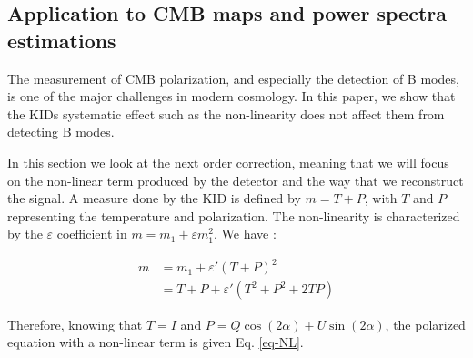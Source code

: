
%


\subsection{Application to CMB maps and power spectra estimations}
The measurement of CMB polarization, and especially the detection of B modes, is one of the major challenges in modern cosmology. In this paper, we show that the KIDs systematic effect such as the non-linearity does not affect them from detecting B modes.

In this section we look at the next order correction, meaning that we will focus on the non-linear term produced by the detector and the way that we reconstruct the signal. A measure done by the KID is defined by $m = T + P$, with $T$ and $P$ representing the temperature and polarization. The non-linearity is characterized  by the $\varepsilon$ coefficient in $ m = m_{1} + \varepsilon m_{1}^{2}$. We have : 

\begin{equation}
\begin{split}
m & = m_{1} +\varepsilon' (T+P)^{2} \\
 & = T + P + \varepsilon'(T^{2} + P^{2} + 2TP) 
\end{split}
\end{equation}

Therefore, knowing that $T=I$ and $P = Q\cos(2\alpha) + U \sin(2\alpha)$, the polarized equation with a non-linear term is given Eq. \ref{eq-NL}.


